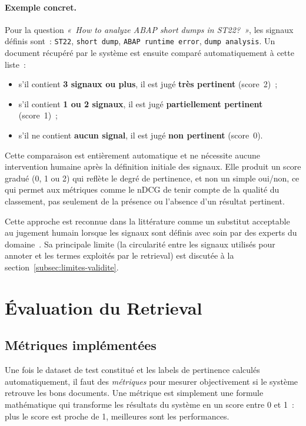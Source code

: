 \paragraph{Exemple concret.}
Pour la question \textit{«~How to analyze ABAP short dumps in ST22?~»}, les signaux définis sont~: \texttt{ST22}, \texttt{short dump}, \texttt{ABAP runtime error}, \texttt{dump analysis}. Un document récupéré par le système est ensuite comparé automatiquement à cette liste~:

\begin{itemize}
  \item s'il contient \textbf{3 signaux ou plus}, il est jugé \textbf{très pertinent} (score~2)~;
  \item s'il contient \textbf{1 ou 2 signaux}, il est jugé \textbf{partiellement pertinent} (score~1)~;
  \item s'il ne contient \textbf{aucun signal}, il est jugé \textbf{non pertinent} (score~0).
\end{itemize}

Cette comparaison est entièrement automatique et ne nécessite aucune intervention humaine après la définition initiale des signaux. Elle produit un score gradué (0, 1 ou 2) qui reflète le degré de pertinence, et non un simple oui/non, ce qui permet aux métriques comme le nDCG de tenir compte de la qualité du classement, pas seulement de la présence ou l'absence d'un résultat pertinent.

Cette approche est reconnue dans la littérature comme un substitut acceptable au jugement humain lorsque les signaux sont définis avec soin par des experts du domaine~\cite{thakur2021beir}. Sa principale limite (la circularité entre les signaux utilisés pour annoter et les termes exploités par le retrieval) est discutée à la section~\ref{subsec:limites-validite}.


\section{Évaluation du Retrieval}

\subsection{Métriques implémentées}

Une fois le dataset de test constitué et les labels de pertinence calculés automatiquement, il faut des \textit{métriques} pour mesurer objectivement si le système retrouve les bons documents. Une métrique est simplement une formule mathématique qui transforme les résultats du système en un score entre 0 et 1~: plus le score est proche de 1, meilleures sont les performances.

